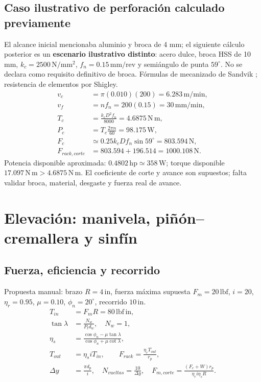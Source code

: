 \documentclass[11pt,a4paper]{article}
\newcommand{\inch}{\,\mathrm{in}}
\newcommand{\lbin}{\,\mathrm{lbf\,in}}
\newcommand{\lbf}{\,\mathrm{lbf}}
\begin{document}
\subsection{Caso ilustrativo de perforación calculado previamente}
El alcance inicial mencionaba aluminio y broca de 4 mm; el siguiente cálculo posterior es un \textbf{escenario ilustrativo distinto}: acero dulce, broca HSS de 10 mm, $k_c=2500\,\mathrm{N/mm^2}$, $f_n=0.15\,\mathrm{mm/rev}$ y semiángulo de punta $59^\circ$. No se declara como requisito definitivo de broca. Fórmulas de mecanizado de Sandvik \cite{sandvik}; resistencia de elementos por Shigley.
\begin{align*}
v_c&=\pi(0.010)(200)=6.283\,\mathrm{m/min},\\
v_f&=nf_n=200(0.15)=30\,\mathrm{mm/min},\\
T_c&=\frac{k_cD^2f_n}{8000}=4.6875\,\mathrm{N\,m},\\
P_c&=T_c\frac{2\pi n}{60}=98.175\,\mathrm W,\\
F_c&\simeq0.25k_cDf_n\sin59^\circ=803.594\,\mathrm N,\\
F_{rack,corte}&=803.594+196.514=1000.108\,\mathrm N.
\end{align*}
Potencia disponible aproximada: $0.4802\,\mathrm{hp}\simeq358\,\mathrm W$; torque disponible $17.097\,\mathrm{N\,m}>4.6875\,\mathrm{N\,m}$. El coeficiente de corte y avance son supuestos; falta validar broca, material, desgaste y fuerza real de avance.

\section{Elevación: manivela, piñón--cremallera y sinfín}
\subsection{Fuerza, eficiencia y recorrido}
Propuesta manual: brazo $R=4\inch$, fuerza máxima supuesta $F_m=20\lbf$, $i=20$, $\eta_r=0.95$, $\mu=0.10$, $\phi_n=20^\circ$, recorrido $10\inch$.
\begin{align*}
T_{in}&=F_mR=80\lbin,\\
\tan\lambda&=\frac{N_w}{P_t d_w},\quad N_w=1,\\
\eta_s&=\frac{\cos\phi_n-\mu\tan\lambda}{\cos\phi_n+\mu\cot\lambda},\\
T_{out}&=\eta_s i T_{in},\qquad F_{rack}=\frac{\eta_rT_{out}}{r_p},\\
\Delta y&=\frac{\pi d_p}{i},\quad N_{vueltas}=\frac{10}{\Delta y},\quad
F_{m,corte}=\frac{(F_c+W)r_p}{\eta_ri\eta_sR}.
\end{align*}
\end{document}
